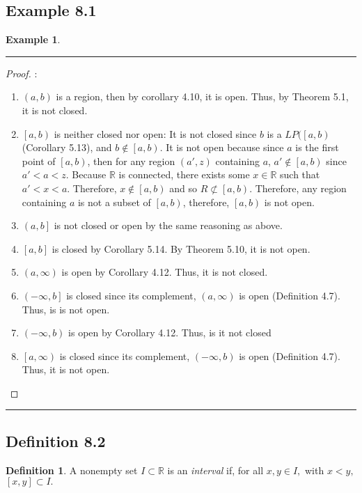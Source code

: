 \documentclass[openany, amssymb, psamsfonts]{amsart}
\newcommand{\bbR}{\mathbb{R}}
\theoremstyle{definition}
\newtheorem{defn}{Definition}[section]
\newtheorem{exmp}{Example}[section]
\numberwithin{equation}{section}
\begin{document}
\subsection*{Example 8.1}
\begin{exmp}
\label{8.1}

\end{exmp}
\vspace{4pt}     \hrule   \vspace{4pt}
\begin{proof}:\\
\begin{enumerate}
\item $(a,b)$ is a region, then by corollary 4.10, it is open. Thus, by Theorem 5.1, it is not closed. 
\item $\left[a,b\right)$ is neither closed nor open: It is not closed since $b$ is a $LP(\left[a,b\right)$ (Corollary 5.13), and $b\notin \left[a,b\right)$. It is not open because since $a$ is the first point of $\left[a,b\right)$, then for any region $(a',z)$ containing $a$, $a'\notin \left[a,b\right)$ since $a'<a<z$. Because $\bbR$ is connected, there exists some $x\in \bbR$ such that $a'<x<a$. Therefore, $x\notin \left[a,b\right)$ and so $R\not\subset \left[a,b\right)$. Therefore, any region containing $a$ is not a subset of $\left[a,b\right)$, therefore, $\left[a,b\right)$ is not open.
\item $\left(a,b\right]$ is not closed or open by the same reasoning as above.
\item $\left[a,b\right]$ is closed by Corollary 5.14. By Theorem 5.10, it is not open. 
\item $\left(a,\infty\right)$ is open by Corollary 4.12. Thus, it is not closed.
\item $\left(-\infty,b\right]$ is closed since its complement, $\left(a,\infty\right)$ is open (Definition 4.7). Thus, is is not open.
\item $\left(-\infty,b\right)$ is open by Corollary 4.12. Thus, is it not closed
\item $\left[a,\infty\right)$ is closed since its complement, $\left(-\infty,b\right)$ is open (Definition 4.7). Thus, it is not open. 
\end{enumerate}
\end{proof} \vspace{4pt}     \hrule   \vspace{4pt}

\subsection*{Definition 8.2}
\begin{defn}
\label{8.2}
A nonempty set $I\subset \bbR$ is an {\em interval} if, for all $x,y\in I,$ with $x<y,$ $[x,y]\subset I.$
\end{defn}
\end{document}
